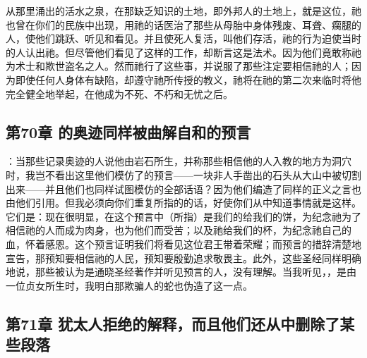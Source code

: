 从那里涌出的活水之泉，在那缺乏知识的土地，即外邦人的土地上，就是这位，祂也曾在你们的民族中出现，用祂的话医治了那些从母胎中身体残废、耳聋、瘸腿的人，使他们跳跃、听见和看见。并且使死人复活，叫他们存活，祂的行为迫使当时的人认出祂。但尽管他们看见了这样的工作，却断言这是法术。因为他们竟敢称祂为术士和欺世盗名之人。然而祂行了这些事，并说服了那些注定要相信祂的人；因为即使任何人身体有缺陷，却遵守祂所传授的教义，祂将在祂的第二次来临时将他完全健全地举起，在他成为不死、不朽和无忧之后。\par


\subsection{第70章 的奥迹同样被曲解自和的预言}

：当那些记录奥迹的人说他由岩石所生，并称那些相信他的人入教的地方为洞穴时，我岂不看出这里他们模仿了的预言——一块非人手凿出的石头从大山中被切割出来——并且他们也同样试图模仿的全部话语？因为他们编造了同样的正义之言也由他们引用。但我必须向你们重复所指的的话，好使你们从中知道事情就是这样。它们是：现在很明显，在这个预言中（所指）是我们的给我们的饼，为纪念祂为了相信祂的人而成为肉身，也为他们而受苦；以及祂给我们的杯，为纪念祂自己的血，怀着感恩。这个预言证明我们将看见这位君王带着荣耀；而预言的措辞清楚地宣告，那预知要相信祂的人民，预知要殷勤追求敬畏主。此外，这些圣经同样明确地说，那些被认为是通晓圣经著作并听见预言的人，没有理解。当我听见，，是由一位贞女所生时，我明白那欺骗人的蛇也伪造了这一点。\par


\subsection{第71章 犹太人拒绝的解释，而且他们还从中删除了某些段落}

